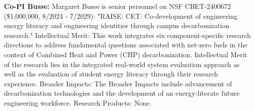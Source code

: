 \documentclass[11pt]{article}
\begin{document}
\noindent\textbf{Co-PI Busse:}
Margaret Busse is senior personnel on NSF CBET-2400672 (\$1,000,000, 8/2024 - 7/2029):
"RAISE: CET: Co-development of engineering energy literacy and engineering identities through campus decarbonization research."
Intellectual Merit:
This work integrates six component-specific research directions to address fundamental questions associated with net-zero fuels in the context of Combined Heat and Power (CHP) decarbonization.
Intellectual Merit of the research lies in the integrated real-world system evaluation approach as well as the evaluation of student energy literacy through their research experience. 
Broader Impacts:
The Broader Impacts include advancement of decarbonization technologies and the development of an energy-literate future engineering workforce.  
Research Products: None.

\newpage

\end{document}
